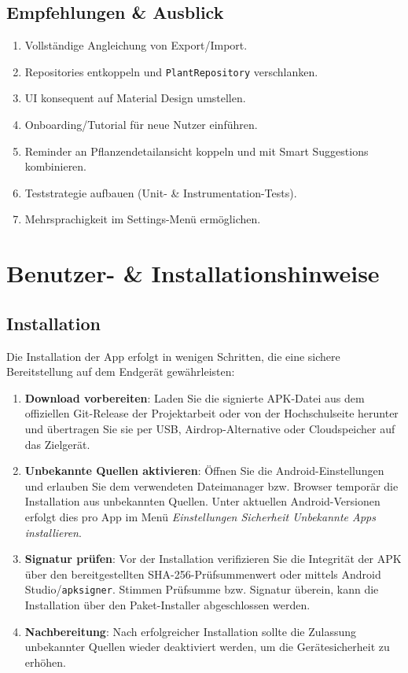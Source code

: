 \documentclass[14pt,a4paper]{report}
\begin{document}
\section{Empfehlungen \& Ausblick}
\begin{enumerate}
    \item Vollständige Angleichung von Export/Import.
    \item Repositories entkoppeln und \texttt{PlantRepository} verschlanken.
    \item UI konsequent auf Material Design umstellen.
    \item Onboarding/Tutorial für neue Nutzer einführen.
    \item Reminder an Pflanzendetailansicht koppeln und mit Smart Suggestions kombinieren.
    \item Teststrategie aufbauen (Unit- \& Instrumentation-Tests).
    \item Mehrsprachigkeit im Settings-Menü ermöglichen.
\end{enumerate}

\chapter{Benutzer- \& Installationshinweise}
\section{Installation}
Die Installation der App erfolgt in wenigen Schritten, die eine sichere Bereitstellung auf dem Endgerät gewährleisten:
\begin{enumerate}
    \item \textbf{Download vorbereiten}: Laden Sie die signierte APK-Datei aus dem offiziellen Git-Release der Projektarbeit oder von der Hochschulseite herunter und übertragen Sie sie per USB, Airdrop-Alternative oder Cloudspeicher auf das Zielgerät.
    \item \textbf{Unbekannte Quellen aktivieren}: Öffnen Sie die Android-Einstellungen und erlauben Sie dem verwendeten Dateimanager bzw. Browser temporär die Installation aus unbekannten Quellen. Unter aktuellen Android-Versionen erfolgt dies pro App im Menü \textit{Einstellungen \textrightarrow{} Sicherheit \textrightarrow{} Unbekannte Apps installieren}.
    \item \textbf{Signatur prüfen}: Vor der Installation verifizieren Sie die Integrität der APK über den bereitgestellten SHA-256-Prüfsummenwert oder mittels Android Studio/\texttt{apksigner}. Stimmen Prüfsumme bzw. Signatur überein, kann die Installation über den Paket-Installer abgeschlossen werden.
    \item \textbf{Nachbereitung}: Nach erfolgreicher Installation sollte die Zulassung unbekannter Quellen wieder deaktiviert werden, um die Gerätesicherheit zu erhöhen.
\end{enumerate}
\end{document}

